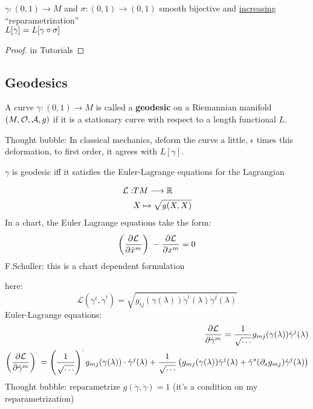 \begin{theorem}
$\gamma : (0,1) \to M$ and $\sigma :(0,1) \to (0,1)$ smooth bijective and \underline{increasing} ``reparametrization'' \\
$L[\gamma] = L[\gamma \after \sigma]$
\end{theorem}

\begin{proof}
  in Tutorials
\end{proof}

\subsection{Geodesics}
\begin{definition}
A curve $\gamma : (0,1) \to M$ is called a \textbf{geodesic} on a Riemannian manifold $(M, \mathcal{O}, \A, g)$ if it is a stationary curve with respect to a length functional $L$.
\end{definition}

Thought bubble: In classical mechanics, deform the curve a little, $\epsilon$ times this deformation, to first order, it agrees with $L[\gamma]$.

\begin{theorem}
$\gamma$ is geodesic iff it satisfies the Euler-Lagrange equations for the Lagrangian
\end{theorem}
\begin{align*}
\mathcal{L} : & TM \to \R \\
& X \mapsto \sqrt{g(X,X)}
\end{align*}
In a chart, the Euler Lagrange equations take the form:
\[
\left(\cibasis[\mathcal{L}]{\dot{x}^m}\right)^{\cdot} - \cibasis[\mathcal{L}]{x^m} = 0 
\]
F.Schuller: this is a chart dependent formulation

here: 
\[
\mathcal{L}(\gamma^i, \dot{\gamma}^i) = \sqrt{g_{ij}(\gamma(\lambda)) \dot{\gamma}^i(\lambda) \dot{\gamma}^j(\lambda)}
\]
Euler-Lagrange equations:
\begin{align*}
\cibasis[\mathcal{L}]{\dot{\gamma}^m} = \frac{1}{\sqrt{\dots}} g_{mj}(\gamma(\lambda)) \dot{\gamma}^j(\lambda) \\
\left(\cibasis[\mathcal{L}]{\dot{\gamma}^m}\right)^{\cdot} = \left(\frac{1}{\sqrt{\dots}} \right)^{\cdot} g_{mj}(\gamma(\lambda)) \cdot \dot{\gamma}^j(\lambda) + \frac{1}{\sqrt{\dots}} \left(g_{mj}(\gamma(\lambda)) \ddot{\gamma}^j(\lambda) + \dot{\gamma}^s(\partial_s g_{mj}) \dot{\gamma}^j(\lambda) \right)
\end{align*}
Thought bubble: reparametrize $g(\dot{\gamma}, \dot{\gamma}) = 1$ (it's a condition on my reparametrization)

